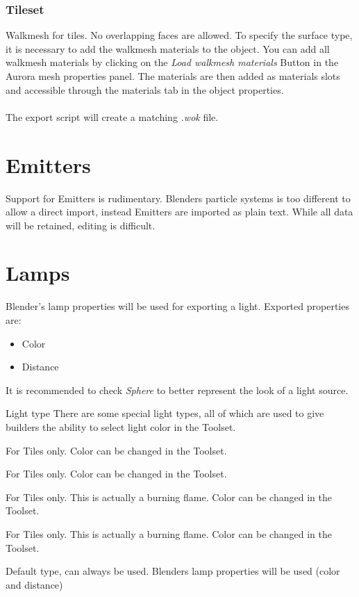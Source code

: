 \subsubsection*{Tileset}
Walkmesh for tiles. No overlapping faces are allowed. To specify the surface type, it is necessary to add the walkmesh materials to the object. You can add all walkmesh materials by clicking on the {\textit{Load walkmesh materials}} Button in the Aurora mesh properties panel. The materials are then added as materials slots and accessible through the materials tab in the object properties. \\ \\
The export script will create a matching {\textit{.wok}} file.


\section{Emitters}
Support for Emitters is rudimentary. Blenders particle systems is too
different to allow a direct import, instead Emitters are imported as plain
text. While all data will be retained, editing is difficult.

\section{Lamps}
Blender's lamp properties will be used for exporting a light.
Exported properties are:
\begin{itemize}
\item Color
\item Distance
\end{itemize}
It is recommended to check \textit{Sphere} to better represent 
the look of a light source.

\begin{property}{Light type}
There are some special light types, all of which are used to give builders
the ability to select light color in the Toolset.
\begin{description}[leftmargin=8em,style=nextline]
    \item[Mainlight 1] For Tiles only. Color can be changed in the Toolset.
    \item[Mainlight 2] For Tiles only. Color can be changed in the Toolset.
    \item[Sourcelight 1] For Tiles only. This is actually a burning flame. Color can be changed in the Toolset.
    \item[Sourcelight 2] For Tiles only. This is actually a burning flame. Color can be changed in the Toolset.
    \item[Default] Default type, can always be used. Blenders lamp properties will be used (color and distance)
\end{description}
\end{property}

